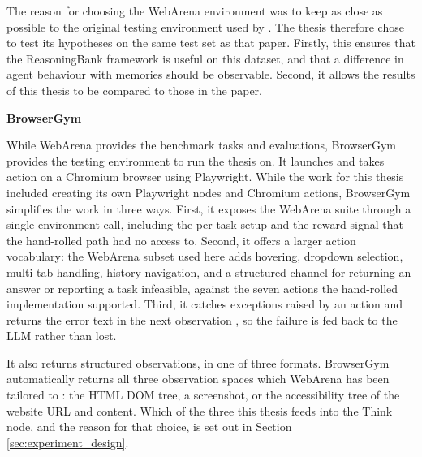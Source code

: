 The reason for choosing the WebArena environment was to keep as close as possible to the original testing environment used by \citet{ouyang2025reasoningbank}. The thesis therefore chose to test its hypotheses on the same test set as that paper. Firstly, this ensures that the ReasoningBank framework is useful on this dataset, and that a difference in agent behaviour with memories should be observable. Second, it allows the results of this thesis to be compared to those in the paper.

\textbf{BrowserGym}

While WebArena provides the benchmark tasks and evaluations, BrowserGym provides the testing environment to run the thesis on. It launches and takes action on a Chromium browser using Playwright. While the work for this thesis included creating its own Playwright nodes and Chromium actions, BrowserGym simplifies the work in three ways. First, it exposes the WebArena suite through a single environment call, including the per-task setup and the reward signal that the hand-rolled path had no access to. Second, it offers a larger action vocabulary: the WebArena subset used here adds hovering, dropdown selection, multi-tab handling, history navigation, and a structured channel for returning an answer or reporting a task infeasible, against the seven actions the hand-rolled implementation supported. Third, it catches exceptions raised by an action and returns the error text in the next observation \citep{dechezelles2024browsergym}, so the failure is fed back to the LLM rather than lost.

It also returns structured observations, in one of three formats. BrowserGym automatically returns all three observation spaces which WebArena has been tailored to \citep{zhou2024webarena, dechezelles2024browsergym}: the HTML DOM tree, a screenshot, or the accessibility tree of the website URL and content. Which of the three this thesis feeds into the Think node, and the reason for that choice, is set out in Section \ref{sec:experiment_design}.
